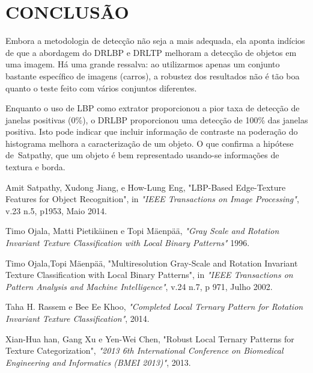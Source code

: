 \documentclass[a4paper,twocolumn]{article}
\begin{document}



\section{CONCLUSÃO}
Embora a metodologia de detecção não seja a mais adequada, ela aponta indícios de que a abordagem do DRLBP e DRLTP melhoram a detecção de objetos em uma imagem. Há uma grande ressalva: ao utilizarmos apenas um conjunto bastante específico de imagens (carros), a robustez dos resultados não é tão boa quanto o teste feito com vários conjuntos diferentes. 

Enquanto o uso de LBP como extrator proporcionou a pior taxa de detecção de janelas positivas (0\%), o DRLBP proporcionou uma detecção de 100\% das janelas positiva. Isto pode indicar que incluir informação de contraste na poderação do histograma melhora a caracterização de um objeto. O que confirma a hipótese de Satpathy, que um objeto é bem representado usando-se informações de textura e borda.

 


\begin{thebibliography}{5}
      Amit Satpathy, Xudong Jiang, e How-Lung Eng,
      "LBP-Based Edge-Texture Features for Object Recognition",
      in \emph{"IEEE Transactions on Image Processing"},
      v.23 n.5,
      p1953,
      Maio 2014.

     Timo Ojala, Matti Pietikäinen e Topi Mäenpää,
     \emph{"Gray Scale and Rotation Invariant Texture Classification with Local Binary Patterns"}
     1996.
     
     Timo Ojala,Topi Mäenpää,
     "Multiresolution Gray-Scale and Rotation Invariant Texture Classification with Local Binary Patterns",
     in \emph{"IEEE Transactions on Pattern Analysis and Machine Intelligence"},
     v.24 n.7,
     p 971,
     Julho 2002.

     Taha H. Rassem e Bee Ee Khoo,
     \emph{"Completed Local Ternary Pattern for Rotation Invariant Texture Classification"},
     2014.
     
      
     Xian-Hua han, Gang Xu e Yen-Wei Chen,
     "Robust Local Ternary Patterns for Texture Categorization",
     \emph{"2013 6th International Conference on Biomedical Engineering and Informatics (BMEI 2013)"},
     2013.
     
     
     
\end{thebibliography}
\end{document}
